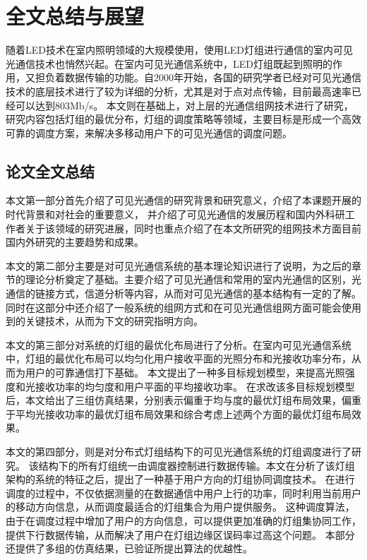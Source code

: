 
\chapter{全文总结与展望}\label{chap:conclusion}
随着LED技术在室内照明领域的大规模使用，使用LED灯组进行通信的室内可见光通信技术也悄然兴起。在室内可见光通信系统中，LED灯组既起到照明的作用，又担负着数据传输的功能。自2000年开始，各国的研究学者已经对可见光通信技术的底层技术进行了较为详细的分析，尤其是对于点对点传输，目前最高速率已经可以达到803Mb/s。
本文则在基础上，对上层的光通信组网技术进行了研究，研究内容包括灯组的最优分布，灯组的调度策略等领域，主要目标是形成一个高效可靠的调度方案，来解决多移动用户下的可见光通信的调度问题。
\section{论文全文总结}
本文第一部分首先介绍了可见光通信的研究背景和研究意义，介绍了本课题开展的时代背景和对社会的重要意义，
并介绍了可见光通信的发展历程和国内外科研工作者关于该领域的研究进展，同时也重点介绍了在本文所研究的组网技术方面目前国内外研究的主要趋势和成果。

本文的第二部分主要是对可见光通信系统的基本理论知识进行了说明，为之后的章节的理论分析奠定了基础。主要介绍了可见光通信和常用的室内光通信的区别，光通信的链接方式，信道分析等内容，从而对可见光通信的基本结构有一定的了解。
同时在这部分中还介绍了一般系统的组网方式和在可见光通信组网方面可能会使用到的关键技术，从而为下文的研究指明方向。

本文的第三部分对系统的灯组的最优化布局进行了分析。在室内可见光通信系统中，灯组的最优化布局可以均匀化用户接收平面的光照分布和光接收功率分布，从而为用户的可靠通信打下基础。
本文提出了一种多目标规划模型，来提高光照强度和光接收功率的均匀度和用户平面的平均接收功率。
在求改该多目标规划模型后，本文给出了三组仿真结果，分别表示偏重于均与度的最优灯组布局效果，偏重于平均光接收功率的最优灯组布局效果和综合考虑上述两个方面的最优灯组布局效果。

本文的第四部分，则是对分布式灯组结构下的可见光通信系统的灯组调度进行了研究。
该结构下的所有灯组统一由调度器控制进行数据传输。本文在分析了该灯组架构的系统的特征之后，提出了一种基于用户方向的灯组协同调度技术。
在进行调度的过程中，不仅依据测量的在数据通信中用户上行的功率，同时利用当前用户的移动方向信息，从而调度最适合的灯组集合为用户提供服务。
这种调度算法，由于在调度过程中增加了用户的方向信息，可以提供更加准确的灯组集协同工作，提供下行数据传输，从而解决了用户在灯组边缘区误码率过高这个问题。
本部分还提供了多组的仿真结果，已验证所提出算法的优越性。

